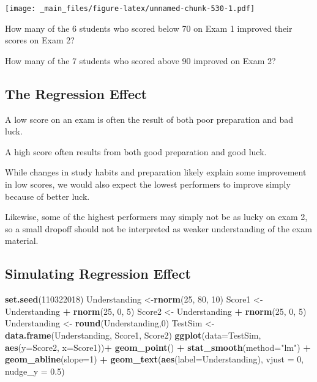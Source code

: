 \documentclass[]{book}
\newenvironment{Shaded}{\begin{snugshade}}{\end{snugshade}}
\newcommand{\KeywordTok}[1]{\textcolor[rgb]{0.13,0.29,0.53}{\textbf{#1}}}
\newcommand{\DataTypeTok}[1]{\textcolor[rgb]{0.13,0.29,0.53}{#1}}
\newcommand{\DecValTok}[1]{\textcolor[rgb]{0.00,0.00,0.81}{#1}}
\newcommand{\FloatTok}[1]{\textcolor[rgb]{0.00,0.00,0.81}{#1}}
\newcommand{\StringTok}[1]{\textcolor[rgb]{0.31,0.60,0.02}{#1}}
\newcommand{\OperatorTok}[1]{\textcolor[rgb]{0.81,0.36,0.00}{\textbf{#1}}}
\newcommand{\NormalTok}[1]{#1}
\begin{document}
\texttt{[image: \_main\_files/figure-latex/unnamed-chunk-530-1.pdf]}

How many of the 6 students who scored below 70 on Exam 1 improved their
scores on Exam 2?

How many of the 7 students who scored above 90 improved on Exam 2?

\subsection{The Regression Effect}\label{the-regression-effect-3}

A low score on an exam is often the result of both poor preparation and
bad luck.

A high score often results from both good preparation and good luck.

While changes in study habits and preparation likely explain some
improvement in low scores, we would also expect the lowest performers to
improve simply because of better luck.

Likewise, some of the highest performers may simply not be as lucky on
exam 2, so a small dropoff should not be interpreted as weaker
understanding of the exam material.

\subsection{Simulating Regression
Effect}\label{simulating-regression-effect}

\begin{Shaded}
\begin{Highlighting}[]
\KeywordTok{set.seed}\NormalTok{(}\DecValTok{110322018}\NormalTok{)}
\NormalTok{Understanding <-}\KeywordTok{rnorm}\NormalTok{(}\DecValTok{25}\NormalTok{, }\DecValTok{80}\NormalTok{, }\DecValTok{10}\NormalTok{)}
\NormalTok{Score1 <-}\StringTok{ }\NormalTok{Understanding }\OperatorTok{+}\StringTok{ }\KeywordTok{rnorm}\NormalTok{(}\DecValTok{25}\NormalTok{, }\DecValTok{0}\NormalTok{, }\DecValTok{5}\NormalTok{)}
\NormalTok{Score2 <-}\StringTok{ }\NormalTok{Understanding }\OperatorTok{+}\StringTok{ }\KeywordTok{rnorm}\NormalTok{(}\DecValTok{25}\NormalTok{, }\DecValTok{0}\NormalTok{, }\DecValTok{5}\NormalTok{)}
\NormalTok{Understanding <-}\StringTok{ }\KeywordTok{round}\NormalTok{(Understanding,}\DecValTok{0}\NormalTok{)}
\NormalTok{TestSim <-}\StringTok{ }\KeywordTok{data.frame}\NormalTok{(Understanding, Score1, Score2)}
\KeywordTok{ggplot}\NormalTok{(}\DataTypeTok{data=}\NormalTok{TestSim, }\KeywordTok{aes}\NormalTok{(}\DataTypeTok{y=}\NormalTok{Score2, }\DataTypeTok{x=}\NormalTok{Score1))}\OperatorTok{+}\StringTok{ }\KeywordTok{geom_point}\NormalTok{() }\OperatorTok{+}\StringTok{ }\KeywordTok{stat_smooth}\NormalTok{(}\DataTypeTok{method=}\StringTok{"lm"}\NormalTok{) }\OperatorTok{+}
\StringTok{  }\KeywordTok{geom_abline}\NormalTok{(}\DataTypeTok{slope=}\DecValTok{1}\NormalTok{) }\OperatorTok{+}\StringTok{ }\KeywordTok{geom_text}\NormalTok{(}\KeywordTok{aes}\NormalTok{(}\DataTypeTok{label=}\NormalTok{Understanding), }\DataTypeTok{vjust =} \DecValTok{0}\NormalTok{, }\DataTypeTok{nudge_y =} \FloatTok{0.5}\NormalTok{)}
\end{Highlighting}
\end{Shaded}
\end{document}
